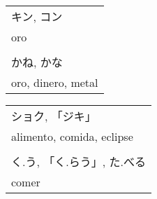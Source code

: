\documentclass[a4paper,12pt,oneside]{report}
\newenvironment{changemargin}{%
 \begin{list}{}{%
\setlength{\textwidth}{\paperwidth}
\setlength{\textheight}{\paperheight}
   \setlength{\leftmargin}{-0.7in}%
   \setlength{\rightmargin}{0.4in}%
   \setlength{\listparindent}{\parindent}%
   \setlength{\itemindent}{\parindent}%
   \setlength{\parsep}{\parskip}%
 }%
\item[]%
}{\end{list}}
\begin{document}
\begin{CJK*}{UTF8}{min}
\begin{changemargin}
\begin{multicols}{2}
  \begin{minipage}{1.1in}
  \end{minipage}
  \begin{minipage}{2in}
    \begin{tabular}{l}
      キン, コン \\
      oro \\
      \\
      かね, かな \\
      oro, dinero, metal \\
    \end{tabular}
  \end{minipage}

  \begin{minipage}{1.1in}
  \end{minipage}
  \begin{minipage}{2in}
    \begin{tabular}{l}
      ショク, 「ジキ」 \\
      alimento, comida, eclipse\\
      \\
      く.う, 「く.らう」, た.べる \\
      comer
    \end{tabular}
  \end{minipage}

\end{multicols}
\end{changemargin}


%
%
%


\end{CJK*}
\end{document}
